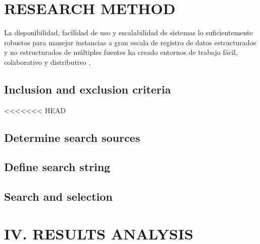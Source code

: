 \documentclass[a4paper,fleqn,spanish]{cas-dc}
\begin{document}



\section{RESEARCH METHOD }\label{metodo}

La disponibilidad, facilidad de uso y escalabilidad de sistemas lo
suficientemente robustos para manejar instancias a gran escala de registro de
datos estructurados y no estructurados de múltiples fuentes ha creado entornos
de trabajo fácil, colaborativo y distributivo
\cite{wieringa_requirements_2006, kitchenham_guidelines_2007, webster_analyzing_2002}.

\subsection{ Inclusion and exclusion criteria}\label{criterio}

\lipsum[2]

<<<<<<< HEAD

\subsection{ Determine search sources}\label{fuentes}

\lipsum[1]


\subsection{Define search string}\label{cadena}

\lipsum[3]


\subsection{Search and selection}\label{seleccion}

\lipsum[4-5]


\section{IV. RESULTS ANALYSIS}\label{resultados}
\end{document}
